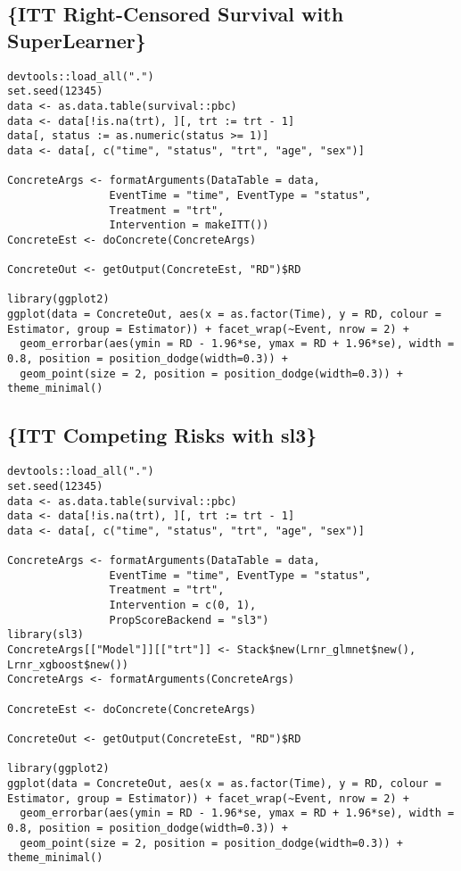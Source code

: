 \documentclass{report}
\newcommand{\1}{\ensuremath{\mathbf{1}}}
\begin{document}
\subsection{\{ITT Right-Censored Survival with SuperLearner\}}
\label{sec:org32487a6}
\begin{lstlisting}
devtools::load_all(".")
set.seed(12345)
data <- as.data.table(survival::pbc)
data <- data[!is.na(trt), ][, trt := trt - 1]
data[, status := as.numeric(status >= 1)]
data <- data[, c("time", "status", "trt", "age", "sex")]

ConcreteArgs <- formatArguments(DataTable = data,
				EventTime = "time", EventType = "status",
				Treatment = "trt",
				Intervention = makeITT())
ConcreteEst <- doConcrete(ConcreteArgs)

ConcreteOut <- getOutput(ConcreteEst, "RD")$RD

library(ggplot2)
ggplot(data = ConcreteOut, aes(x = as.factor(Time), y = RD, colour = Estimator, group = Estimator)) + facet_wrap(~Event, nrow = 2) + 
  geom_errorbar(aes(ymin = RD - 1.96*se, ymax = RD + 1.96*se), width = 0.8, position = position_dodge(width=0.3)) +
  geom_point(size = 2, position = position_dodge(width=0.3)) + theme_minimal()
\end{lstlisting}

\subsection{\{ITT Competing Risks with sl3\}}
\label{sec:orgffac3ac}
\begin{lstlisting}
devtools::load_all(".")
set.seed(12345)
data <- as.data.table(survival::pbc)
data <- data[!is.na(trt), ][, trt := trt - 1]
data <- data[, c("time", "status", "trt", "age", "sex")]

ConcreteArgs <- formatArguments(DataTable = data,
				EventTime = "time", EventType = "status",
				Treatment = "trt",
				Intervention = c(0, 1),
				PropScoreBackend = "sl3")
library(sl3)
ConcreteArgs[["Model"]][["trt"]] <- Stack$new(Lrnr_glmnet$new(), Lrnr_xgboost$new())
ConcreteArgs <- formatArguments(ConcreteArgs)

ConcreteEst <- doConcrete(ConcreteArgs)

ConcreteOut <- getOutput(ConcreteEst, "RD")$RD

library(ggplot2)
ggplot(data = ConcreteOut, aes(x = as.factor(Time), y = RD, colour = Estimator, group = Estimator)) + facet_wrap(~Event, nrow = 2) + 
  geom_errorbar(aes(ymin = RD - 1.96*se, ymax = RD + 1.96*se), width = 0.8, position = position_dodge(width=0.3)) +
  geom_point(size = 2, position = position_dodge(width=0.3)) + theme_minimal()
\end{lstlisting}
\end{document}
